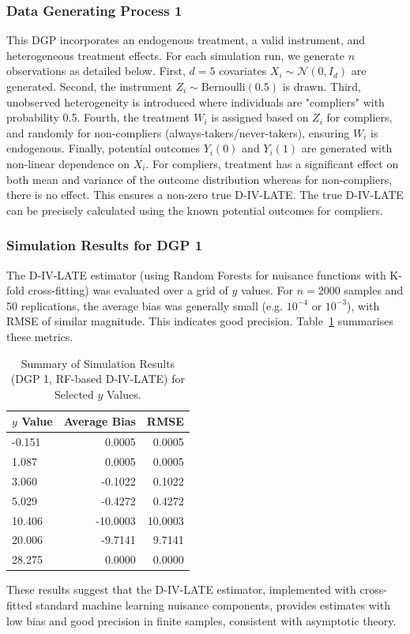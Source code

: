 \documentclass[final,3p,fleqn, 10pt]{elsarticle}
\begin{document}
\subsubsection{Data Generating Process 1}
This DGP incorporates an endogenous treatment, a valid instrument, and heterogeneous treatment effects. For each simulation run, we generate $n$ observations as detailed below.
First, $d=5$ covariates $X_i \sim \mathcal{N}(0, I_d)$ are generated. Second, the instrument $Z_i \sim \text{Bernoulli}(0.5)$ is drawn. Third, unobserved heterogeneity is introduced where individuals are "compliers" with probability 0.5. Fourth, the treatment $W_i$ is assigned based on $Z_i$ for compliers, and randomly for non-compliers (always-takers/never-takers), ensuring $W_i$ is endogenous. Finally, potential outcomes $Y_i(0)$ and $Y_i(1)$ are generated with non-linear dependence on $X_i$. For compliers, treatment has a significant effect on both mean and variance of the outcome distribution whereas for non-compliers, there is no effect. This ensures a non-zero true D-IV-LATE.
The true D-IV-LATE can be precisely calculated using the known potential outcomes for compliers.

\subsubsection{Simulation Results for DGP 1}
The D-IV-LATE estimator (using Random Forests for nuisance functions with K-fold cross-fitting) was evaluated over a grid of $y$ values. For $n=2000$ samples and 50 replications, the average bias was generally small (e.g. $10^{-4}$ or $10^{-3}$), with RMSE of similar magnitude. This indicates good precision. Table~\ref{tab:sim_results_summary_dgp1} summarises these metrics.

\begin{table}[htbp]
\centering
\caption{Summary of Simulation Results (DGP 1, RF-based D-IV-LATE) for Selected $y$ Values.}
\label{tab:sim_results_summary_dgp1}
\begin{tabular}{@{}lrr@{}}
\toprule
$y$ Value & Average Bias & RMSE \\
\midrule
-0.151  & 0.0005  & 0.0005 \\
1.087   & 0.0005  & 0.0005 \\
3.060   & -0.1022 & 0.1022 \\
5.029   & -0.4272 & 0.4272 \\
10.406  & -10.0003 & 10.0003 \\
20.006  & -9.7141 & 9.7141 \\
28.275  & 0.0000  & 0.0000 \\
\bottomrule
\end{tabular}
\end{table}
These results suggest that the D-IV-LATE estimator, implemented with cross-fitted standard machine learning nuisance components, provides estimates with low bias and good precision in finite samples, consistent with asymptotic theory.
\end{document}
